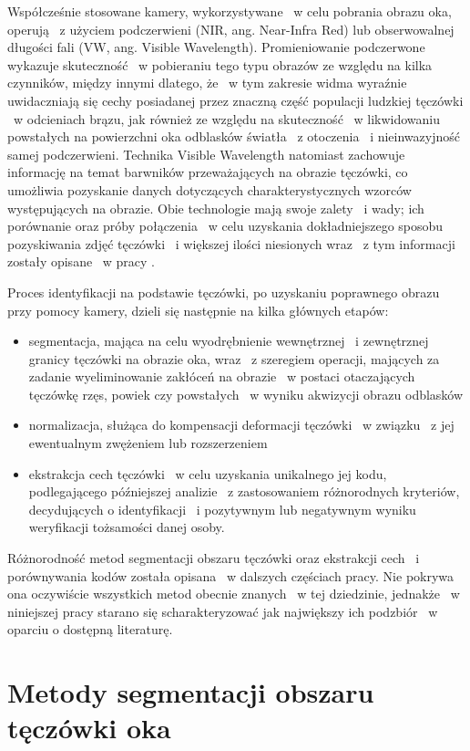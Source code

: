 Współcześnie stosowane kamery, wykorzystywane ~w celu pobrania obrazu oka, operują ~z użyciem podczerwieni (NIR, ang. Near-Infra Red) lub obserwowalnej długości fali (VW, ang. Visible Wavelength). Promieniowanie podczerwone wykazuje skuteczność ~w pobieraniu tego typu obrazów ze względu na kilka czynników, między innymi dlatego, że ~w tym zakresie widma wyraźnie uwidaczniają się cechy posiadanej przez znaczną część populacji ludzkiej tęczówki ~w  odcieniach brązu, jak również ze względu na skuteczność ~w likwidowaniu powstałych na powierzchni oka odblasków światła ~z otoczenia ~i nieinwazyjność samej podczerwieni. Technika Visible Wavelength natomiast zachowuje informację na temat barwników przeważających na obrazie tęczówki, co umożliwia pozyskanie danych dotyczących charakterystycznych wzorców występujących na obrazie. Obie technologie mają swoje zalety ~i wady; ich porównanie oraz próby połączenia ~w celu uzyskania dokładniejszego sposobu pozyskiwania zdjęć tęczówki ~i większej ilości niesionych wraz ~z tym informacji zostały opisane ~w pracy \cite{Hos10}. 

Proces identyfikacji na podstawie tęczówki, po uzyskaniu poprawnego obrazu przy pomocy kamery, dzieli się następnie na kilka głównych etapów: \begin{itemize}
\item segmentacja, mająca na celu wyodrębnienie wewnętrznej ~i zewnętrznej granicy tęczówki na obrazie oka, wraz ~z szeregiem operacji, mających za zadanie wyeliminowanie zakłóceń na obrazie ~w postaci otaczających tęczówkę rzęs, powiek czy powstałych ~w wyniku akwizycji obrazu odblasków
\item normalizacja, służąca do kompensacji deformacji tęczówki ~w związku ~z jej ewentualnym zwężeniem lub rozszerzeniem 
\item ekstrakcja cech tęczówki ~w celu uzyskania unikalnego jej kodu, podlegającego późniejszej analizie ~z zastosowaniem różnorodnych kryteriów, decydujących o identyfikacji ~i pozytywnym lub negatywnym wyniku weryfikacji tożsamości danej osoby.
\end{itemize}

Różnorodność metod segmentacji obszaru tęczówki oraz ekstrakcji cech ~i porównywania kodów została opisana ~w dalszych częściach pracy. Nie pokrywa ona oczywiście wszystkich metod obecnie znanych ~w tej dziedzinie, jednakże ~w niniejszej pracy starano się scharakteryzować jak największy ich podzbiór ~w oparciu o dostępną literaturę.


\section{Metody segmentacji obszaru tęczówki oka}
\label{sec:segmentacja}

